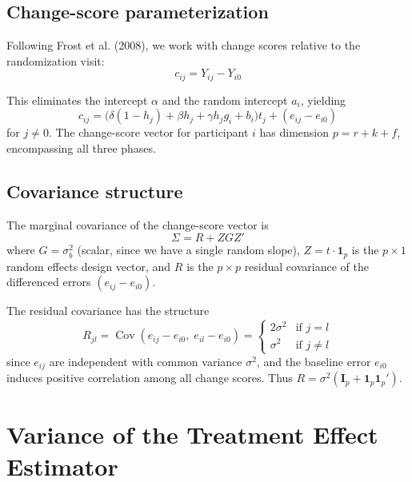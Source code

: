 \documentclass[
]{article}
\begin{document}
\subsection{Change-score
parameterization}\label{change-score-parameterization}

Following Frost et al. (2008), we work with change scores relative to
the randomization visit: \begin{equation}
  c_{ij} = Y_{ij} - Y_{i0}
  \label{eq:change}
\end{equation}

This eliminates the intercept \(\alpha\) and the random intercept
\(a_i\), yielding \begin{equation}
  c_{ij} = \bigl(\delta(1-h_j) + \beta h_j
    + \gamma h_j g_i + b_i\bigr) t_j
    + (e_{ij} - e_{i0})
  \label{eq:change_model}
\end{equation} for \(j \ne 0\). The change-score vector for participant
\(i\) has dimension \(p = r + k + f\), encompassing all three phases.

\subsection{Covariance structure}\label{covariance-structure}

The marginal covariance of the change-score vector is \begin{equation}
  \Sigma = R + Z G Z'
  \label{eq:sigma}
\end{equation} where \(G = \sigma_b^2\) (scalar, since we have a single
random slope), \(Z = t \cdot \mathbf{1}_p\) is the \(p \times 1\) random
effects design vector, and \(R\) is the \(p \times p\) residual
covariance of the differenced errors \((e_{ij} - e_{i0})\).

The residual covariance has the structure \begin{equation}
  R_{jl} = \mathop{\mathrm{Cov}}(e_{ij} - e_{i0},\; e_{il} - e_{i0})
  = \begin{cases}
    2\sigma^2 & \text{if } j = l \\
    \sigma^2  & \text{if } j \ne l
  \end{cases}
  \label{eq:R}
\end{equation} since \(e_{ij}\) are independent with common variance
\(\sigma^2\), and the baseline error \(e_{i0}\) induces positive
correlation among all change scores. Thus
\(R = \sigma^2(\mathbf{I}_p + \mathbf{1}_p \mathbf{1}_p')\).

\section{Variance of the Treatment Effect
Estimator}\label{variance-of-the-treatment-effect-estimator}
\end{document}
